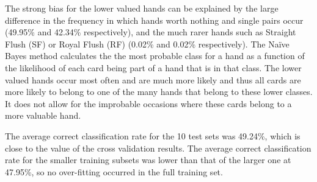 \documentclass[10pt, a4paper]{article}
\begin{document}
The strong bias for the lower valued hands can be explained by the large difference in the frequency in which hands worth nothing and single pairs occur (49.95\% and 42.34\% respectively), and the much rarer hands such as Straight Flush (SF) or Royal Flush (RF) (0.02\% and 0.02\% respectively). The Na\"ive Bayes method calculates the the most probable class for a hand as a function of the likelihood of each card being part of a hand that is in that class. The lower valued hands occur most often and are much more likely and thus all cards are more likely to belong to one of the many hands that belong to these lower classes. It does not allow for the improbable occasions where these cards belong to a more valuable hand.

The average correct classification rate for the 10 test sets was 49.24\%, which is close to the value of the cross validation results. The average correct classification rate for the smaller training subsets was lower than that of the larger one at 47.95\%, so no over-fitting occurred in the full training set. 
\end{document}
